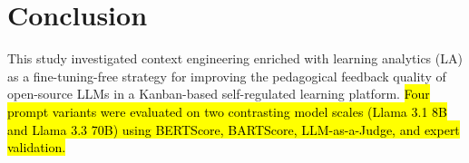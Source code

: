\documentclass[conference,a4paper]{IEEEtran}
\begin{document}



\section{Conclusion}\label{sec:conclusion}

This study investigated context engineering enriched with
learning analytics (LA) as a fine-tuning-free strategy for
improving the pedagogical feedback quality of open-source
LLMs in a Kanban-based self-regulated learning platform.
\hl{Four prompt variants were evaluated on two contrasting
model scales (Llama 3.1 8B and Llama 3.3 70B) using
BERTScore, BARTScore, LLM-as-a-Judge, and expert
validation.}
\end{document}
